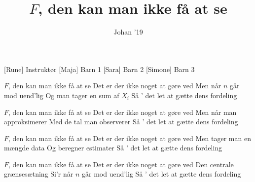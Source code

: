 \documentclass[a4paper,11pt]{article}
\title{$F$, den kan man ikke få at se}
\author{Johan '19}
\begin{document}
\maketitle

\begin{roles}
[Rune] Instruktør
[Maja] Barn 1
[Sara] Barn 2
[Simone] Barn 3
\end{roles}



\begin{song}
 $F$, den kan man ikke få at se
Det er der ikke noget at gøre ved
Men når $n$ går mod uend'lig
Og man tager en sum af $X_i$
Så ' det let at gætte dens fordeling

$F$, den kan man ikke få at se
Det er der ikke noget at gøre ved
Men når man approksimerer
Med de tal man observerer
Så ' det let at gætte dens fordeling

$F$, den kan man ikke få at se
Det er der ikke noget at gøre ved
Men tager man en mængde data
Og beregner estimater
Så ' det let at gætte dens fordeling

$F$, den kan man ikke få at se
Det er der ikke noget at gøre ved
Den centrale grænsesætning
Si'r når $n$ går mod uend'lig
Så ' det let at gætte dens fordeling
\end{song}
\end{document}
